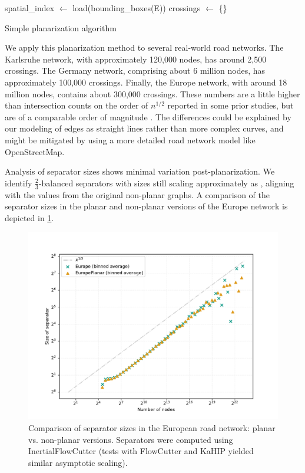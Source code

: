 \begin{algorithm}[tbhp]
    \BlankLine
    spatial\_index \(\longleftarrow\) load(bounding\_boxes(E))\;
    crossings \(\longleftarrow\) \{\}\;
    \caption{Simple planarization algorithm \label{alg:planarization}}
\end{algorithm}

We apply this planarization method to several real-world road networks.
The Karlsruhe network, with approximately 120,000 nodes, has around 2,500 crossings.
The Germany network, comprising about 6 million nodes, has approximately 100,000 crossings.
Finally, the Europe network, with around 18 million nodes, contains about 300,000 crossings.
These numbers are a little higher than intersection counts on the order of \(n^{1/2}\) reported in some prior studies, but are of a comparable order of magnitude \cite{eppstein_studying_2008}.
The differences could be explained by our modeling of edges as straight lines rather than more complex curves, and might be mitigated by using a more detailed road network model like OpenStreetMap.

Analysis of separator sizes shows minimal variation post-planarization.
We identify \(\frac{2}{3}\)-balanced separators with sizes still scaling approximately as , aligning with the values from the original non-planar graphs.
A comparison of the separator sizes in the planar and non-planar versions of the Europe network is depicted in \cref{fig:germany_planar_vs_non_planar}.

\begin{figure}[tbhp]
    \centering
    \includegraphics[width=0.6\linewidth]{graphics/EuropePlanarVsNonPlanar.pdf}
    \caption{Comparison of separator sizes in the European road network: planar vs. non-planar versions. Separators were computed using InertialFlowCutter (tests with FlowCutter and KaHIP yielded similar asymptotic scaling).}
    \label{fig:germany_planar_vs_non_planar}
\end{figure}


